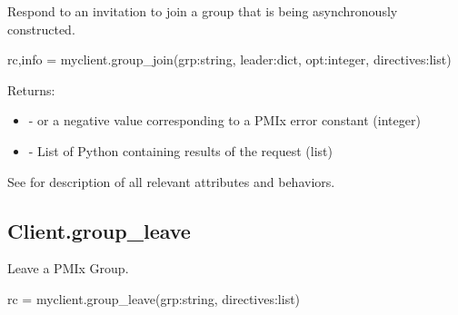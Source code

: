 \summary

Respond to an invitation to join a group that is being asynchronously constructed.

\format

\pyspecificstart
\begin{codepar}
rc,info = myclient.group_join(grp:string,
                        leader:dict, opt:integer,
                        directives:list)
\end{codepar}
\pyspecificend

\begin{arglist}
\end{arglist}

Returns:

\begin{itemize}
    \item {} -  or a negative value corresponding to a PMIx error constant (integer)
    \item {} - List of Python  containing results of the request (list)
\end{itemize}

See  for description of all relevant attributes and behaviors.


\subsection{Client.group_leave}

\summary

Leave a PMIx Group.

\format

\pyspecificstart
\begin{codepar}
rc = myclient.group_leave(grp:string, directives:list)
\end{codepar}
\pyspecificend

\begin{arglist}
\end{arglist}

